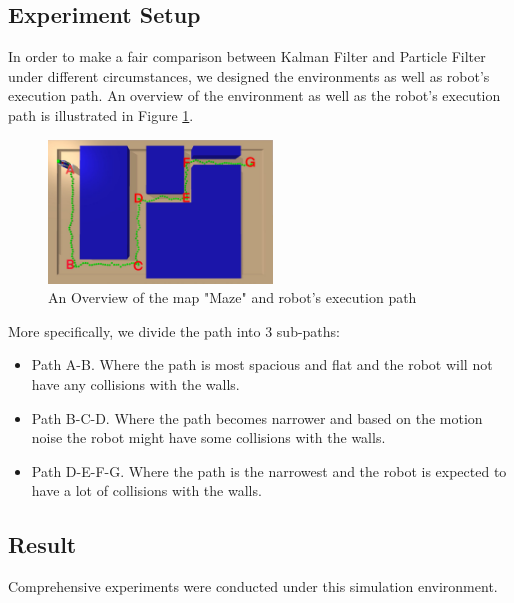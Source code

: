 \documentclass[conference,onecolumn]{IEEEtran}
\begin{document}
\subsection{Experiment Setup}

In order to make a fair comparison between Kalman Filter and Particle Filter under different circumstances, we designed the environments as well as robot's execution path. An overview of the environment as well as the robot's execution path is illustrated in Figure \ref{fig: maze}.


    
    



\begin{figure}[H] 
 \centering 
 \includegraphics[width=0.53\textwidth]{Figs/Maze.jpg} 
 \caption{An Overview of the map "Maze" and robot's execution path} 
 \label{fig: maze} 
 \end{figure}

More specifically, we divide the path into 3 sub-paths:

\begin{itemize}
    \item Path A-B. Where the path is most spacious and flat and the robot will not have any collisions with the walls.
    
    

   \item Path B-C-D. Where the path becomes narrower and based on the motion noise the robot might have some collisions with the walls.
   
   
    \item Path D-E-F-G. Where the path is the narrowest and the robot is expected to have a lot of collisions with the walls.
    \end{itemize}

\subsection{Result}
Comprehensive experiments were conducted under this simulation environment. 
\end{document}
